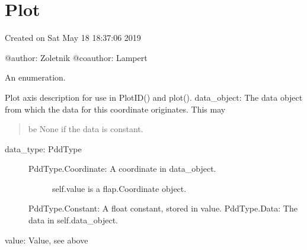 \documentclass[letterpaper,10pt,english]{sphinxmanual}
\begin{document}
\section{Plot}
\label{\detokenize{plot:module-flap.plot}}\label{\detokenize{plot:plot}}\label{\detokenize{plot::doc}}
Created on Sat May 18 18:37:06 2019

@author: Zoletnik
@coauthor: Lampert

\begin{fulllineitems}
\label{\detokenize{plot:flap.plot.PddType}}
An enumeration.

\end{fulllineitems}


\begin{fulllineitems}
\label{\detokenize{plot:flap.plot.PlotDataDescription}}
Plot axis description for use in PlotID() and plot().
data\_object: The data object from which the data for this coordinate originates. This may
\begin{quote}

be None if the data is constant.
\end{quote}
\begin{description}
\item[{data\_type: PddType}] \leavevmode\begin{description}
\item[{PddType.Coordinate: A coordinate in data\_object.}] \leavevmode
self.value is a flap.Coordinate object.

\end{description}

PddType.Constant: A float constant, stored in value.
PddType.Data: The data in self.data\_object.

\end{description}

value: Value, see above

\end{fulllineitems}
\end{document}
